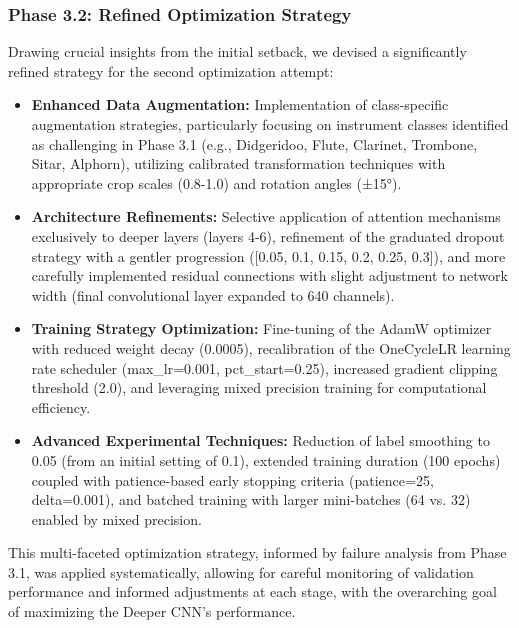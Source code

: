 \subsubsection{Phase 3.2: Refined Optimization Strategy}
Drawing crucial insights from the initial setback, we devised a significantly refined strategy for the second optimization attempt:
\begin{itemize}
    \item \textbf{Enhanced Data Augmentation:} Implementation of class-specific augmentation strategies, particularly focusing on instrument classes identified as challenging in Phase 3.1 (e.g., Didgeridoo, Flute, Clarinet, Trombone, Sitar, Alphorn), utilizing calibrated transformation techniques with appropriate crop scales (0.8-1.0) and rotation angles (±15°).
    \item \textbf{Architecture Refinements:} Selective application of attention mechanisms exclusively to deeper layers (layers 4-6), refinement of the graduated dropout strategy with a gentler progression ([0.05, 0.1, 0.15, 0.2, 0.25, 0.3]), and more carefully implemented residual connections with slight adjustment to network width (final convolutional layer expanded to 640 channels).
    \item \textbf{Training Strategy Optimization:} Fine-tuning of the AdamW optimizer with reduced weight decay (0.0005), recalibration of the OneCycleLR learning rate scheduler (max\_lr=0.001, pct\_start=0.25), increased gradient clipping threshold (2.0), and leveraging mixed precision training for computational efficiency.
    \item \textbf{Advanced Experimental Techniques:} Reduction of label smoothing to 0.05 (from an initial setting of 0.1), extended training duration (100 epochs) coupled with patience-based early stopping criteria (patience=25, delta=0.001), and batched training with larger mini-batches (64 vs. 32) enabled by mixed precision.
\end{itemize}
This multi-faceted optimization strategy, informed by failure analysis from Phase 3.1, was applied systematically, allowing for careful monitoring of validation performance and informed adjustments at each stage, with the overarching goal of maximizing the Deeper CNN's performance.

